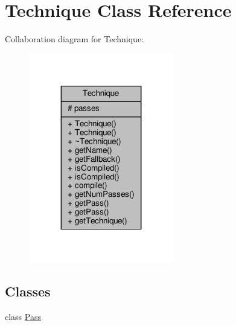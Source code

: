 \hypertarget{classTechnique}{}\section{Technique Class Reference}
\label{classTechnique}


Collaboration diagram for Technique\+:
\nopagebreak
\begin{figure}[H]
\begin{center}
\leavevmode
\includegraphics[width=179pt]{df/dbb/classTechnique__coll__graph}
\end{center}
\end{figure}
\subsection*{Classes}
\begin{DoxyCompactItemize}
\item 
class \hyperlink{classTechnique_1_1Pass}{Pass}
\end{DoxyCompactItemize}

